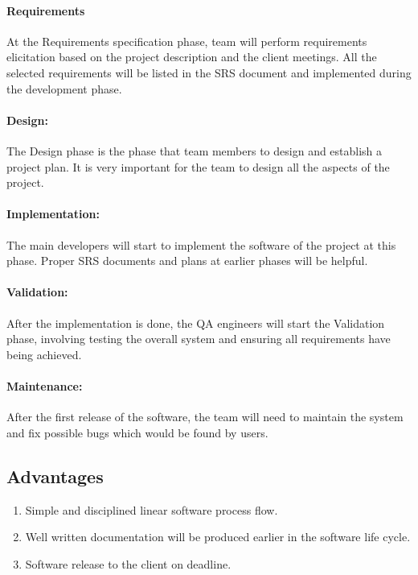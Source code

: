 \documentclass[11pt, a4paper]{report}
\begin{document}
\paragraph{Requirements}
At the Requirements specification phase, team will perform requirements elicitation based on the project description and the client meetings. All the selected requirements will be listed in the SRS document and implemented during the development phase.

\paragraph{Design:}
The Design phase is the phase that team members to design and establish a project plan. It is very important for the team to design all the aspects of the project.

\paragraph{Implementation:}
The main developers will start to implement the software of the project at this phase. Proper SRS documents and plans at earlier phases will be helpful. 

\paragraph{Validation:}
After the implementation is done, the QA engineers will start the Validation phase, involving testing the overall system and ensuring all requirements have being achieved. 

\paragraph{Maintenance:}
After the first release of the software, the team will need to maintain the system and fix possible bugs which would be found by users.

\subsection{Advantages}
\begin{enumerate}
	\item  Simple and disciplined linear software process flow.
	\item  Well written documentation will be produced earlier in the software life cycle.
	\item  Software release to the client on deadline.
\end{enumerate}
\end{document}
